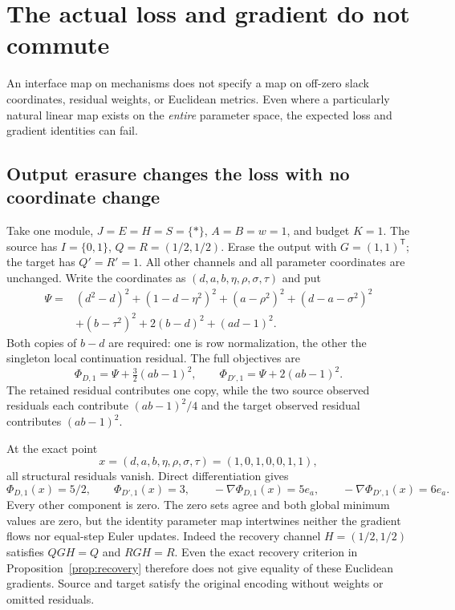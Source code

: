 \documentclass[11pt]{article}
\theoremstyle{remark}
\begin{document}
\section{The actual loss and gradient do not commute}\label{sec:loss}
An interface map on mechanisms does not specify a map on off-zero slack coordinates, residual weights, or Euclidean metrics. Even where a particularly natural linear map exists on the \emph{entire} parameter space, the expected loss and gradient identities can fail.

\subsection{Output erasure changes the loss with no coordinate change}\label{sec:loss-rise}
Take one module, $J=E=H=S=\{*\}$, $A=B=w=1$, and budget $K=1$. The source has $I=\{0,1\}$, $Q=R=(1/2,1/2)$. Erase the output with $G=(1,1)^{\mathsf T}$; the target has $Q'=R'=1$. All other channels and all parameter coordinates are unchanged. Write the coordinates as $(d,a,b,\eta,\rho,\sigma,\tau)$ and put
\begin{align*}
 \Psi={}&(d^2-d)^2+(1-d-\eta^2)^2+(a-\rho^2)^2
 +(d-a-\sigma^2)^2\\
 &+(b-\tau^2)^2+2(b-d)^2+(ad-1)^2.
\end{align*}
Both copies of $b-d$ are required: one is row normalization, the other the singleton local continuation residual. The full objectives are
\begin{equation}\label{eq:actual-objective-rise}
 \Phi_{D,1}=\Psi+\tfrac32(ab-1)^2,\qquad
 \Phi_{D',1}=\Psi+2(ab-1)^2.
\end{equation}
The retained residual contributes one copy, while the two source observed residuals each contribute $(ab-1)^2/4$ and the target observed residual contributes $(ab-1)^2$.

At the exact point
\[
 x=(d,a,b,\eta,\rho,\sigma,\tau)=(1,0,1,0,0,1,1),
\]
all structural residuals vanish. Direct differentiation gives
\begin{equation}\label{eq:gradient-rise}
 \Phi_{D,1}(x)=5/2,\qquad \Phi_{D',1}(x)=3,\qquad
 -\nabla\Phi_{D,1}(x)=5e_a,\qquad
 -\nabla\Phi_{D',1}(x)=6e_a.
\end{equation}
Every other component is zero. The zero sets agree and both global minimum values are zero, but the identity parameter map intertwines neither the gradient flows nor equal-step Euler updates. Indeed the recovery channel $H=(1/2,1/2)$ satisfies $QGH=Q$ and $RGH=R$. Even the exact recovery criterion in Proposition~\ref{prop:recovery} therefore does not give equality of these Euclidean gradients. Source and target satisfy the original encoding without weights or omitted residuals.
\end{document}
